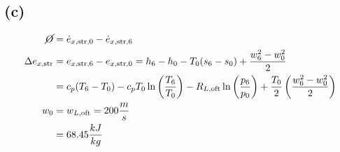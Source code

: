 

\subsection*{(c)}

\begin{align*}
    \cancel{O} &= \dot{e}_{x, \text{str}, 0} - \dot{e}_{x, \text{str}, 6} \\
    \Delta e_{x, \text{str}} &= e_{x, \text{str}, 6} - e_{x, \text{str}, 0} = h_6 - h_0 - T_0 (s_6 - s_0) + \frac{w_6^2 - w_0^2}{2} \\
    &= c_p (T_6 - T_0) - c_p T_0 \ln \left( \frac{T_6}{T_0} \right) - R_{L, \text{oft}} \ln \left( \frac{p_6}{p_0} \right) + \frac{T_0}{2} \left( \frac{w_6^2 - w_0^2}{2} \right) \\
    w_0 &= w_{L, \text{oft}} = 200 \frac{m}{s} \\
    &= 68.45 \frac{kJ}{kg}
\end{align*}